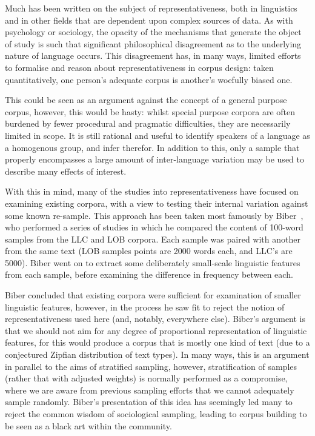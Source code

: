 Much has been written on the subject of representativeness, both in linguistics and in other fields that are dependent upon complex sources of data.  As with psychology or sociology, the opacity of the mechanisms that generate the object of study is such that significant philosophical disagreement as to the underlying nature of language occurs.  This disagreement has, in many ways, limited efforts to formalise and reason about representativeness in corpus design: taken quantitatively, one person's adequate corpus is another's woefully biased one.

This could be seen as an argument against the concept of a general purpose corpus, however, this would be hasty: whilst special purpose corpora are often burdened by fewer procedural and pragmatic difficulties, they are necessarily limited in scope.  It is still rational and useful to identify speakers of a language as a homogenous group, and infer therefor.  In addition to this, only a sample that properly encompasses a large amount of inter-language variation may be used to describe many effects of interest.

With this in mind, many of the studies into representativeness have focused on examining existing corpora, with a view to testing their internal variation against some known re-sample.  This approach has been taken most famously by Biber~\cite{biber1993representativeness}, who performed a series of studies in which he compared the content of 100-word samples from the LLC and LOB corpora.  Each sample was paired with another from the same text (LOB samples points are 2000 words each, and LLC's are 5000).  Biber went on to extract some deliberately small-scale linguistic features from each sample, before examining the difference in frequency between each.


Biber concluded that existing corpora were sufficient for examination of smaller linguistic features, however, in the process he saw fit to reject the notion of representativeness used here (and, notably, everywhere else).  Biber's argument is that we should not aim for any degree of proportional representation of linguistic features, for this would produce a corpus that is mostly one kind of text (due to a conjectured Zipfian distribution of text types).  In many ways, this is an argument in parallel to the aims of stratified sampling, however, stratification of samples (rather that with adjusted weights) is normally performed as a compromise, where we are aware from previous sampling efforts that we cannot adequately sample randomly.  Biber's presentation of this idea has seemingly led many to reject the common wisdom of sociological sampling, leading to corpus building to be seen as a black art within the community.


